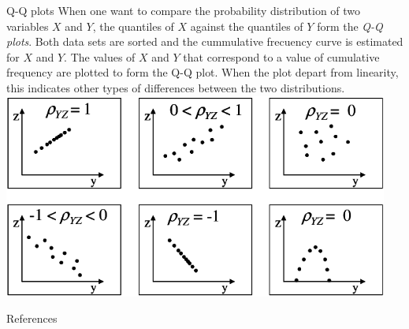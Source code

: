 \documentclass[8pt]{beamer}
\begin{document}
\begin{frame}{Q-Q plots}
    When one want to compare the probability distribution of two variables $X$ and $Y$, the quantiles of $X$ against the quantiles of $Y$ form the \emph{Q-Q plots}. Both data sets are sorted and the cummulative frecuency curve is estimated for $X$ and $Y$. The values of $X$ and $Y$ that correspond to a value of cumulative frequency are plotted to form the Q-Q plot. When the plot depart from linearity, this indicates other types of differences between the two distributions. 
    \includegraphics[width=0.95\textwidth]{fiBi213.png}
        \vspace{-0.1cm}
\end{frame}




\begin{frame}[allowframebreaks]{References}
 
    
\end{frame}
\end{document}
